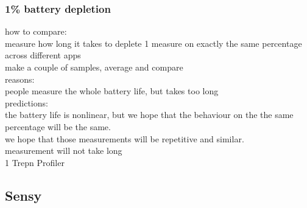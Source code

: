 \subsubsection{1\% battery depletion}	
\label{s:design:measurements:method}			
how to compare:\\
	measure how long it takes to deplete 1%
		measure on exactly the same percentage across different apps\\
		make a couple of samples, average and compare\\
		reasons:\\
			people measure the whole battery life, but takes too long\\
			
			
		predictions:\\
			the battery life is nonlinear, but we hope that the behaviour on the the same percentage will be the same.\\
			we hope that those measurements will be repetitive and similar.\\
			measurement will not take long\\
			1%
	Trepn Profiler\\
			
			
		
		
		
\subsection{Sensy}
\label{s:design:sensy}
